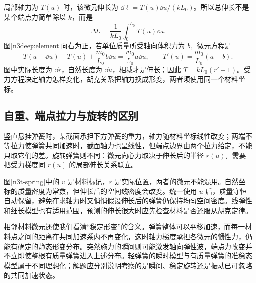 局部轴力为 $T(u)$ 时，该微元伸长为 $\dd\ell=T(u)\dd u/(kL_0)$。所以总伸长不是某个端点力简单除以 $k$，而是
\[\Delta L=\frac1{kL_0}\int_0^{L_0}T(u)\dd u.\]
图\ref{n3deep:element}向右为正，若单位质量所受轴向体积力为 $b$，微元方程是
\[
T(u+\dd u)-T(u)+\frac{m_0}{L_0}b\dd u
=\frac{m_0}{L_0}a\dd u,
\qquad T'(u)=\frac{m_0}{L_0}(a-b).
\]
图中实际长度为 $\dd r$，自然长度为 $\dd u$，相减才是伸长；因此 $T=kL_0(r'-1)$。受力方程决定轴力怎样变化，胡克关系把轴力换成形变，两者须使用同一个材料坐标。

\subsection{自重、端点拉力与旋转的区别}
竖直悬挂弹簧时，某截面承担下方弹簧的重力，轴力随材料坐标线性改变；两端不等拉力使弹簧共同加速时，截面轴力也呈线性，但端点边界由两个拉力给定，不能只取它们的差。旋转弹簧则不同：微元向心力取决于伸长后的半径 $r(u)$，需要把受力梯度同 $r(u)$ 的局部伸长关系联立。

图\ref{n3t-spring}中的 $u$ 是材料标记，$r$ 是实际位置，两者的微元不能混用。自然坐标的质量密度为常数，但伸长后的空间线密度会改变。统一使用 $u$ 后，质量守恒自动保留，避免在求轴力时又悄悄假设伸长后的弹簧仍保持均匀空间密度。线弹性和细长模型也有适用范围，预测的伸长很大时应先检查材料是否还服从胡克定律。

相邻材料微元还使我们看清“稳定形变”的含义。弹簧整体可以平移加速，而每一材料点之间的距离在共同加速系内不再变化，这时轴力梯度承担各微元的惯性力，仍能有确定的静态形变分布。突然施力的瞬间则可能激发轴向弹性波，端点力改变并不立即使整根有质量弹簧进入上述分布。轻弹簧的瞬时模型与有质量弹簧的准稳态模型属于不同理想化；解题应分别说明考察的是瞬间、稳定旋转还是振动已可忽略的共同加速状态。
